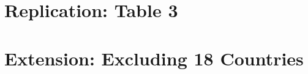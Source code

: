 \documentclass[12pt,a4paper]{article}
\begin{document}
\section{Replication: Table 3}

\begin{table}[H]
\centering
\caption{Finance and Sector-Level Carbon Emissions: OLS}
\resizebox{\textwidth}{!}{%
    
}
\end{table}

\section{Extension: Excluding 18 Countries}

\begin{table}[H]
\centering
\caption{Finance and Sector-Level Carbon Emissions: Extension}
\resizebox{\textwidth}{!}{%
    
}
\end{table}
\end{document}
